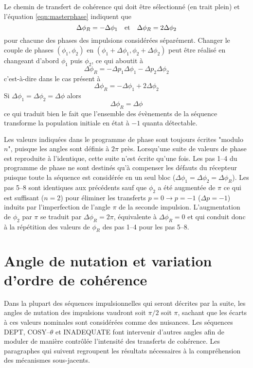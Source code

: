 Le chemin de transfert de cohérence qui doit être sélectionné (en trait plein)
et l'équation \ref{eqn:masterphase} indiquent que
\begin{equation}
\Delta\phi_R = -\Delta\phi_1 \quad \mbox{et} \quad \Delta\phi_R = 2\Delta\phi_2
\end{equation}
pour chacune des phases des impulsions considérées séparément.
Changer le couple de phases $(\phi_1, \phi_2)$ en 
$(\phi_1+\Delta\phi_1, \phi_2+\Delta\phi_2)$ peut être réalisé en changeant
d'abord $\phi_1$ puis $\phi_2$, ce qui aboutit à
\begin{equation}
\Delta\phi_R = -\Delta p_1 \Delta\phi_1 -\Delta p_2 \Delta\phi_2
\end{equation}
c'est-à-dire dans le cas présent à
\begin{equation}
\Delta\phi_R = -\Delta\phi_1 +2\Delta\phi_2
\end{equation}
Si $\Delta\phi_1=\Delta\phi_2=\Delta\phi$ alors
\begin{equation}
\Delta\phi_R = \Delta\phi
\end{equation}
ce qui traduit bien le fait que l'ensemble des évènements de la séquence
transforme la population initiale en état à $-1$ quanta détectable.

Les valeurs indiquées dans le programme de phase sont toujours écrites "modulo $n$",
puisque les angles sont définis à $2\pi$ près.
Lorsqu'une suite de valeurs de phase est reproduite à l'identique, cette suite
n'est écrite qu'une fois.
Les pas 1--4 du programme de phase ne sont destinés qu'à compenser les défauts du récepteur
puisque toute la séquence est considérée en un seul bloc 
($\Delta\phi_1 = \Delta\phi_2 = \Delta\phi_R$).
Les pas 5--8 sont identiques aux précédents sauf que $\phi_2$ a été augmentée de $\pi$
ce qui est suffisant ($n=2$) pour éliminer les transferts $p=0 \rightarrow p=-1$
($\Delta p = -1$) induits
par l'imperfection de l'angle $\pi$ de la seconde impulsion.
L'augmentation de $\phi_2$ par $\pi$ se traduit par $\Delta\phi_R = 2\pi$,
équivalente à $\Delta\phi_R=0$ et qui conduit donc à la répétition des valeurs de $\phi_R$
des pas 1--4 pour les pas 5--8.

\section{Angle de nutation et variation d'ordre de cohérence}
Dans la plupart des séquences impulsionnelles qui seront décrites par la suite,
les angles de nutation des impulsions vaudront soit $\pi/2$ soit $\pi$,
sachant que les écarts à ces valeurs nominales sont considérées comme des nuisances.
Les séquences DEPT, COSY--$\theta$ et INADEQUATE font intervenir d'autres angles
afin de moduler de manière contrôlée l'intensité des transferts de cohérence.
Les paragraphes qui suivent regroupent les résultats nécessaires à la compréhension 
des mécanismes sous-jacents.

